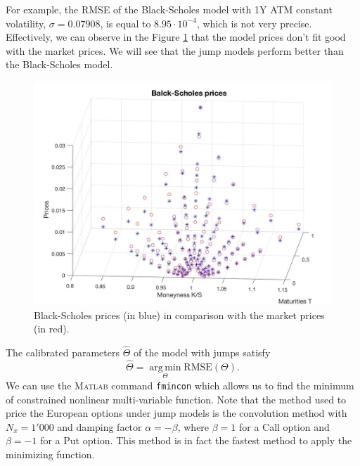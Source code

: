 For example, the RMSE of the Black-Scholes model with 1Y ATM constant volatility, $\sigma = 0.07908$, is equal to $8.95\cdot 10^{-4}$, which is not very precise. Effectively, we can observe in the Figure \ref{fig:calibration:BS} that the model prices don't fit good with the market prices. We will see that the jump models perform better than the Black-Scholes model. 
\begin{figure}[!htb]
\centering
	\includegraphics[scale = 0.3]{gfx/BS-prices}
	\caption{Black-Scholes prices (in blue) in comparison with the market prices (in red).}
	\label{fig:calibration:BS}
\end{figure}

The calibrated parameters $\hat{\Theta}$ of the model with jumps satisfy 
$$\hat{\Theta}=\operatorname*{arg\,min}_\Theta \text{RMSE}(\Theta).$$
We can use the \textsc{Matlab} command \texttt{fmincon} which allows us to find the minimum of constrained nonlinear multi-variable function. Note that the method used to price the European options under jump models is the convolution method with $N_x = 1'000$ and damping factor $\alpha = -\beta$, where $\beta = 1$ for a Call option and $\beta = -1$ for a Put option. This method is in fact the fastest method to apply the minimizing function.

